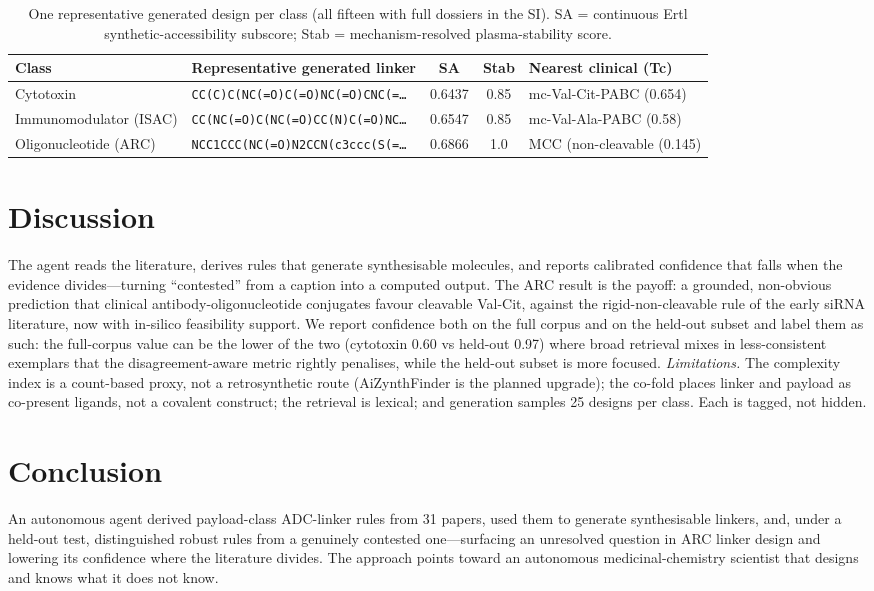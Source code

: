 \documentclass[10pt]{article}
\begin{document}
\begin{table}[t]\centering\caption{One representative generated design per class (all fifteen with full dossiers in the SI). SA = continuous Ertl synthetic-accessibility subscore; Stab = mechanism-resolved plasma-stability score.}\label{tab:short}\small
\begin{tabular}{l l c c l}\toprule
Class & Representative generated linker & SA & Stab & Nearest clinical (Tc) \\ \midrule
Cytotoxin & \texttt{CC(C)C(NC(=O)C(=O)NC(=O)CNC(=\ldots{}} & 0.6437 & 0.85 & mc-Val-Cit-PABC (0.654) \\
Immunomodulator (ISAC) & \texttt{CC(NC(=O)C(NC(=O)CC(N)C(=O)NC\ldots{}} & 0.6547 & 0.85 & mc-Val-Ala-PABC (0.58) \\
Oligonucleotide (ARC) & \texttt{NCC1CCC(NC(=O)N2CCN(c3ccc(S(=\ldots{}} & 0.6866 & 1.0 & MCC (non-cleavable (0.145) \\
\bottomrule\end{tabular}\end{table}
\section{Discussion}The agent reads the literature, derives rules that generate synthesisable molecules, and reports calibrated confidence that falls when the evidence divides---turning ``contested'' from a caption into a computed output. The ARC result is the payoff: a grounded, non-obvious prediction that clinical antibody-oligonucleotide conjugates favour cleavable Val-Cit, against the rigid-non-cleavable rule of the early siRNA literature, now with in-silico feasibility support. We report confidence both on the full corpus and on the held-out subset and label them as such: the full-corpus value can be the lower of the two (cytotoxin 0.60 vs held-out 0.97) where broad retrieval mixes in less-consistent exemplars that the disagreement-aware metric rightly penalises, while the held-out subset is more focused. \emph{Limitations.} The complexity index is a count-based proxy, not a retrosynthetic route (AiZynthFinder is the planned upgrade); the co-fold places linker and payload as co-present ligands, not a covalent construct; the retrieval is lexical; and generation samples 25 designs per class. Each is tagged, not hidden.
\section{Conclusion}An autonomous agent derived payload-class ADC-linker rules from 31 papers, used them to generate synthesisable linkers, and, under a held-out test, distinguished robust rules from a genuinely contested one---surfacing an unresolved question in ARC linker design and lowering its confidence where the literature divides. The approach points toward an autonomous medicinal-chemistry scientist that designs and knows what it does not know.
\end{document}
